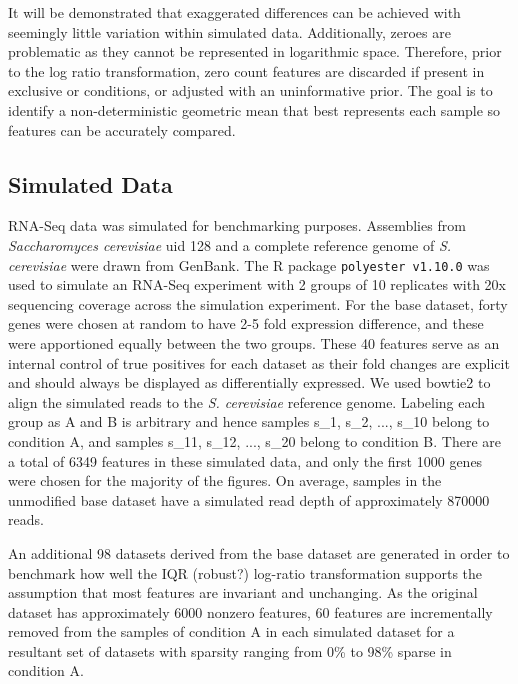 \documentclass [10pt]{article}
\begin{document}
It will be demonstrated that exaggerated differences can be achieved with seemingly little variation within simulated data. Additionally, zeroes are problematic as they cannot be represented in logarithmic space. Therefore, prior to the log ratio transformation, zero count features are discarded if present in exclusive or conditions, or adjusted with an uninformative prior. The goal is to identify a non-deterministic geometric mean that best represents each sample so features can be accurately compared.

\subsection{Simulated Data}
\vskip-0.25cm
RNA-Seq data was simulated for benchmarking purposes. Assemblies from \textit{Saccharomyces cerevisiae} uid 128 and  a complete reference genome of \textit{S. cerevisiae} were drawn from GenBank. The R package \texttt{polyester v1.10.0} was used to simulate an RNA-Seq experiment with 2 groups of 10 replicates with 20x sequencing coverage across the simulation experiment. For the base dataset, forty genes were chosen at random to have 2-5 fold expression difference, and these were apportioned equally between the two groups. These 40 features serve as an internal control of true positives for each dataset as their fold changes are explicit and should always be displayed as differentially expressed. We used bowtie2 to align the simulated reads  to the \textit{S. cerevisiae} reference genome. Labeling each group as A and B is arbitrary and hence samples s\_1, s\_2, ..., s\_10 belong to condition A, and samples s\_11, s\_12, ..., s\_20 belong to condition B. There are a total of 6349 features in these simulated data, and only the first 1000 genes were chosen for the majority of the figures. On average, samples in the unmodified base dataset have a simulated read depth of approximately 870000 reads. 

An additional 98 datasets derived from the base dataset are generated in order to benchmark how well the IQR (robust?) log-ratio transformation supports the assumption that most features are invariant and unchanging. As the original dataset has approximately 6000 nonzero features, 60 features are incrementally removed from the samples of condition A in each simulated dataset for a resultant set of datasets with sparsity ranging from 0\% to 98\% sparse in condition A. 
\end{document}
